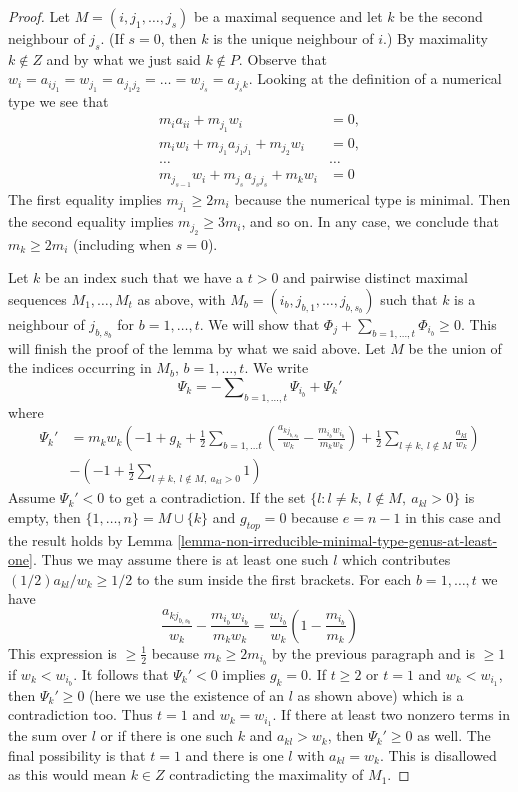 \documentclass{stacks-project}
\theoremstyle{plain}
\theoremstyle{definition}
\theoremstyle{remark}
\numberwithin{equation}{subsection}
\begin{document}
\begin{proof}
\medskip\noindent
Let $M = (i, j_1, \ldots, j_s)$ be a maximal sequence and let
$k$ be the second neighbour of $j_s$. (If $s = 0$, then $k$
is the unique neighbour of $i$.) By maximality $k \not \in Z$
and by what we just said $k \not \in P$. Observe that
$w_i = a_{ij_1} = w_{j_1} = a_{j_1j_2} = \ldots = w_{j_s} =
a_{j_sk}$. Looking at the definition
of a numerical type we see that
\begin{align*}
m_ia_{ii} + m_{j_1}w_i & = 0,\\
m_iw_i + m_{j_1}a_{j_1j_1} + m_{j_2}w_i & = 0,\\
\ldots & \ldots \\
m_{j_{s - 1}}w_i + m_{j_s}a_{j_sj_s} + m_kw_i & = 0
\end{align*}
The first equality implies $m_{j_1} \geq 2m_i$ because the
numerical type is minimal. Then the second equality implies
$m_{j_2} \geq 3m_i$, and so on. In any case, we conclude that
$m_k \geq 2m_i$ (including when $s = 0$).

\medskip\noindent
Let $k$ be an index such that we have a $t > 0$ and pairwise distinct
maximal sequences $M_1, \ldots, M_t$ as above, with
$M_b = (i_b, j_{b, 1}, \ldots, j_{b, s_b})$
such that $k$ is a neighbour of $j_{b, s_b}$ for $b = 1, \ldots, t$.
We will show that $\Phi_j + \sum_{b = 1, \ldots, t} \Phi_{i_b} \geq 0$.
This will finish the proof of the lemma by what we said above.
Let $M$ be the union of the indices occurring in $M_b$, $b = 1, \ldots, t$.
We write
$$
\Psi_k =
-\sum\nolimits_{b = 1, \ldots, t} \Psi_{i_b} + \Psi_k'
$$
where
\begin{align*}
\Psi_k' & =
m_kw_k\left(-1 + g_k +
\frac{1}{2} \sum\nolimits_{b = 1, \ldots t}
(\frac{a_{kj_{b, s_b}}}{w_k} - \frac{m_{i_b}w_{i_b}}{m_kw_k}) +
\frac{1}{2} \sum\nolimits_{l \not = k,\ l \not \in M}
\frac{a_{kl}}{w_k}
\right) \\
&
-\left(
-1 + \frac{1}{2}\sum\nolimits_{l \not = k,\ l \not \in M,\ a_{kl} > 0} 1
\right)
\end{align*}
Assume $\Psi_k' < 0$ to get a contradiction.
If the set $\{l : l \not = k,\ l \not \in M,\ a_{kl} > 0\}$ is empty,
then $\{1, \ldots, n\} = M \cup \{k\}$ and $g_{top} = 0$
because $e = n - 1$ in this case and the result holds by
Lemma \ref{lemma-non-irreducible-minimal-type-genus-at-least-one}.
Thus we may assume there is at least one such $l$ which contributes
$(1/2)a_{kl}/w_k \geq 1/2$ to the sum inside the first brackets.
For each $b = 1, \ldots, t$ we have
$$
\frac{a_{kj_{b, s_b}}}{w_k} - \frac{m_{i_b}w_{i_b}}{m_kw_k} =
\frac{w_{i_b}}{w_k}(1 - \frac{m_{i_b}}{m_k})
$$
This expression is $\geq \frac{1}{2}$ because $m_k \geq 2m_{i_b}$
by the previous paragraph and is $\geq 1$ if $w_k < w_{i_b}$.
It follows that $\Psi_k' < 0$ implies $g_k = 0$.
If $t \geq 2$ or $t = 1$ and $w_k < w_{i_1}$, then $\Psi_k' \geq 0$
(here we use the existence of an $l$ as shown above) which
is a contradiction too.
Thus $t = 1$ and $w_k = w_{i_1}$. If there at least two nonzero terms
in the sum over $l$ or if there is one such $k$ and $a_{kl} > w_k$, then
$\Psi_k' \geq 0$ as well. The final possibility is that $t = 1$ and
there is one $l$ with $a_{kl} = w_k$. This is disallowed as this would
mean $k \in Z$ contradicting the maximality of $M_1$.
\end{proof}
\end{document}
